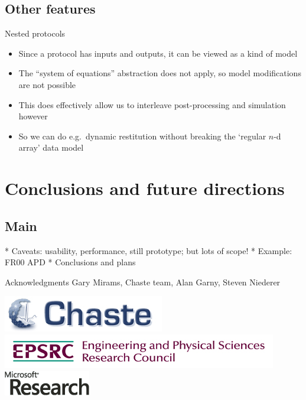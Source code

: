 \documentclass[t,xcolor={usenames,dvipsnames}]{beamer}
\begin{document}
\subsection{Other features}

\begin{frame}{Nested protocols}
\begin{itemize}
\item Since a protocol has inputs and outputs, it can be viewed as a kind of model
\item The ``system of equations'' abstraction does not apply, so model modifications are not possible
\item This does effectively allow us to interleave post-processing and simulation however
\item So we can do e.g.\ dynamic restitution without breaking the `regular $n$-d array' data model
\end{itemize}
\end{frame}

\section{Conclusions and future directions}
\subsection*{Main}

\begin{frame}{}
 * Caveats: usability, performance, still prototype; but lots of scope!
   * Example: FR00 APD
 * Conclusions and plans
\end{frame}

\begin{frame}{Acknowledgments}
Gary Mirams, Chaste team, Alan Garny, Steven Niederer

\begin{center}
\includegraphics[scale=.9]{chaste-266x60}\\ \vspace{.4cm}
\includegraphics[width=.55\textwidth]{EPSRC1RGBLO} \hspace{.1cm}
\includegraphics[scale=.55]{logo_msr}
\end{center}
\end{frame}
\end{document}
